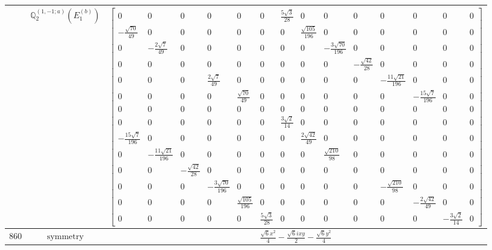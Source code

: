 \documentclass[fleqn,8pt,landscape]{jsarticle}
\begin{document}
\begin{longtable}{ccc}
$  $ & $ \mathbb{Q}_{2}^{(1,-1;a)}(E_{1}^{(b)}) $ & $ \begin{bmatrix} 0 & 0 & 0 & 0 & 0 & 0 & \frac{5 \sqrt{3}}{28} & 0 & 0 & 0 & 0 & 0 & 0 & 0 \\ - \frac{\sqrt{70}}{49} & 0 & 0 & 0 & 0 & 0 & 0 & \frac{\sqrt{105}}{196} & 0 & 0 & 0 & 0 & 0 & 0 \\ 0 & - \frac{2 \sqrt{7}}{49} & 0 & 0 & 0 & 0 & 0 & 0 & - \frac{3 \sqrt{70}}{196} & 0 & 0 & 0 & 0 & 0 \\ 0 & 0 & 0 & 0 & 0 & 0 & 0 & 0 & 0 & - \frac{\sqrt{42}}{28} & 0 & 0 & 0 & 0 \\ 0 & 0 & 0 & \frac{2 \sqrt{7}}{49} & 0 & 0 & 0 & 0 & 0 & 0 & - \frac{11 \sqrt{21}}{196} & 0 & 0 & 0 \\ 0 & 0 & 0 & 0 & \frac{\sqrt{70}}{49} & 0 & 0 & 0 & 0 & 0 & 0 & - \frac{15 \sqrt{7}}{196} & 0 & 0 \\ 0 & 0 & 0 & 0 & 0 & 0 & 0 & 0 & 0 & 0 & 0 & 0 & 0 & 0 \\ 0 & 0 & 0 & 0 & 0 & 0 & \frac{3 \sqrt{2}}{14} & 0 & 0 & 0 & 0 & 0 & 0 & 0 \\ - \frac{15 \sqrt{7}}{196} & 0 & 0 & 0 & 0 & 0 & 0 & \frac{2 \sqrt{42}}{49} & 0 & 0 & 0 & 0 & 0 & 0 \\ 0 & - \frac{11 \sqrt{21}}{196} & 0 & 0 & 0 & 0 & 0 & 0 & \frac{\sqrt{210}}{98} & 0 & 0 & 0 & 0 & 0 \\ 0 & 0 & - \frac{\sqrt{42}}{28} & 0 & 0 & 0 & 0 & 0 & 0 & 0 & 0 & 0 & 0 & 0 \\ 0 & 0 & 0 & - \frac{3 \sqrt{70}}{196} & 0 & 0 & 0 & 0 & 0 & 0 & - \frac{\sqrt{210}}{98} & 0 & 0 & 0 \\ 0 & 0 & 0 & 0 & \frac{\sqrt{105}}{196} & 0 & 0 & 0 & 0 & 0 & 0 & - \frac{2 \sqrt{42}}{49} & 0 & 0 \\ 0 & 0 & 0 & 0 & 0 & \frac{5 \sqrt{3}}{28} & 0 & 0 & 0 & 0 & 0 & 0 & - \frac{3 \sqrt{2}}{14} & 0 \end{bmatrix} $ \\ \hline
$ 860 $ & $ \text{symmetry} $ & $ \frac{\sqrt{6} x^{2}}{4} - \frac{\sqrt{6} i x y}{2} - \frac{\sqrt{6} y^{2}}{4} $ \\

\end{longtable}
\end{document}
